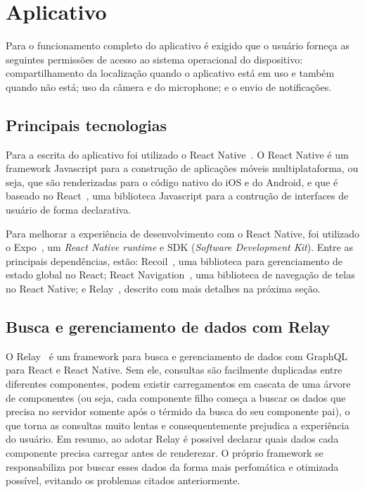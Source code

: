 \FloatBarrier

\section{Aplicativo}

Para o funcionamento completo do aplicativo é exigido que o usuário forneça as seguintes permissões de acesso ao sistema operacional do dispositivo: compartilhamento da localização quando o aplicativo está em uso e também quando não está; uso da câmera e do microphone; e o envio de notificações. 

\subsection{Principais tecnologias}

Para a escrita do aplicativo foi utilizado o React Native~\cite{react-native}. O React Native é um framework Javascript para a construção de aplicações móveis multiplataforma, ou seja, que são renderizadas para o código nativo do iOS e do Android, e que é baseado no React~\cite{react}, uma biblioteca Javascript para a contrução de interfaces de usuário de forma declarativa.

Para melhorar a experiência de desenvolvimento com o React Native, foi utilizado o Expo~\cite{expo}, um \emph{React Native runtime} e SDK (\emph{Software Development Kit}). Entre as principais dependências, estão: Recoil~\cite{recoil}, uma biblioteca para gerenciamento de estado global no React; React Navigation~\cite{react-navigation}, uma biblioteca de navegação de telas no React Native; e Relay~\cite{relay}, descrito com mais detalhes na próxima seção.

\subsection{Busca e gerenciamento de dados com Relay}

O Relay~\cite{relay} é um framework para busca e gerenciamento de dados com GraphQL para React e React Native. Sem ele, consultas são facilmente duplicadas entre diferentes componentes, podem existir carregamentos em cascata de uma árvore de componentes (ou seja, cada componente filho começa a buscar os dados que precisa no servidor somente após o térmido da busca do seu componente pai), o que torna as consultas muito lentas e consequentemente prejudica a experiência do usuário. Em resumo, ao adotar Relay é possivel declarar quais dados cada componente precisa carregar antes de renderezar. O próprio framework se responsabiliza por buscar esses dados da forma mais perfomática e otimizada possível, evitando os problemas citados anteriormente.

